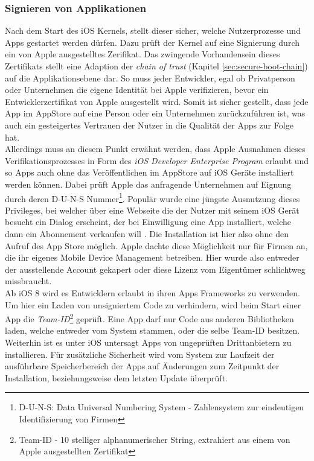 	\subsubsection{Signieren von Applikationen}\label{sec:appsigning}
		Nach dem Start des iOS Kernels, stellt dieser sicher, welche Nutzerprozesse
		und Apps gestartet werden dürfen. Dazu prüft der Kernel auf eine Signierung
		durch ein von Apple ausgestelltes Zerifikat. Das zwingende Vorhandensein
		dieses Zertifikats stellt eine Adaption der \textsl{chain of trust} (Kapitel
		\ref{sec:secure-boot-chain}) auf die Applikationsebene dar. So muss jeder
		Entwickler, egal ob Privatperson oder Unternehmen die eigene Identität bei
		Apple verifizieren, bevor ein Entwicklerzertifikat von Apple ausgestellt
		wird. Somit ist sicher gestellt, dass jede App im AppStore auf eine Person
		oder ein Unternehmen zurückzuführen ist, was auch ein gesteigertes Vertrauen
		der Nutzer in die Qualität der Apps zur Folge hat.\\
		Allerdings muss an diesem Punkt erwähnt werden, dass Apple Ausnahmen dieses
		Verifikationsprozesses in Form des \textsl{iOS Developer Enterprise
		Program} \cite{AppleDevProg2015}
		erlaubt und so Apps auch ohne das Veröffentlichen im AppStore auf iOS Geräte
		installiert werden können. Dabei prüft Apple das anfragende Unternehmen auf
		Eignung durch deren D-U-N-S Nummer\footnote{D-U-N-S: Data Universal Numbering
		System - Zahlensystem zur eindeutigen Identifizierung von Firmen}. Populär wurde eine jüngste Ausnutzung dieses
		Privileges, bei welcher über eine Webseite die der Nutzer mit seinem iOS
		Gerät besucht ein Dialog erscheint, der bei Einwilligung eine App
		installiert, welche dann ein Abonnement verkaufen will
		\cite{HeiseCheatApp2015}.
		Die Installation ist hier also ohne den Aufruf des
		App Store möglich. Apple dachte diese Möglichkeit nur für Firmen an, die ihr
		eigenes Mobile Device Management betreiben. Hier wurde also entweder der
		ausstellende Account gekapert oder diese Lizenz vom Eigentümer schlichtweg
		missbraucht.\\
		Ab iOS 8 wird es Entwicklern erlaubt in ihren Apps Frameworks zu verwenden. Um
		hier ein Laden von unsigniertem Code zu verhindern, wird beim Start einer App
		die \textsl{Team-ID}\footnote{Team-ID - 10 stelliger
		alphanumerischer String, extrahiert aus einem von Apple ausgestellten
		Zertifikat} geprüft. Eine App darf nur Code aus anderen Bibliotheken laden,
		welche entweder vom System stammen, oder die selbe Team-ID besitzen.
		Weiterhin ist es unter iOS untersagt Apps von ungeprüften Drittanbietern zu
		installieren. Für zusätzliche Sicherheit wird vom System zur
		Laufzeit der ausführbare Speicherbereich der Apps auf Änderungen zum
		Zeitpunkt der Installation, beziehungsweise dem letzten Update überprüft.
		
